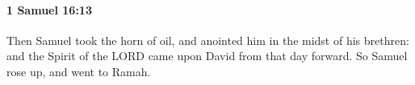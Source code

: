 
		\paragraph{1 Samuel 16:13} %
			\label{1SAMUEL-16-13}

			Then Samuel took the horn of oil, and anointed him in the midst of his brethren: and the Spirit of the LORD came upon David from that day forward. So Samuel rose up, and went to Ramah.


